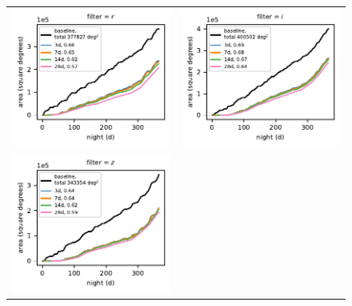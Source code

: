 \documentclass[preprintm,linenumbers]{aastex631}
\begin{document}
\begin{figure}
\begin{tabular}{@{}c@{}c@{}}
				\includegraphics{results/first_year_one_snap_v4_0_10yrs_db_noDD_noTwi_cum_baseline_r.pdf} &
				\includegraphics{results/first_year_one_snap_v4_0_10yrs_db_noDD_noTwi_cum_baseline_i.pdf} \\
				\includegraphics{results/first_year_one_snap_v4_0_10yrs_db_noDD_noTwi_cum_baseline_z.pdf} &

\end{tabular}
\end{figure}
\end{document}
